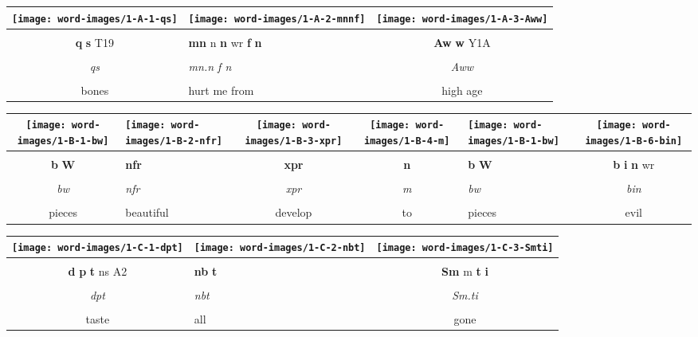 \vspace{7.5mm}

\begin{tabularx}{\linewidth}{cYc}
	\texttt{[image: word-images/1-A-1-qs]} &
	\texttt{[image: word-images/1-A-2-mnnf]} &
	\texttt{[image: word-images/1-A-3-Aww]} \\
	\hline \\ 
	\textbf{q} \textbf{s} T19 &
	\textbf{mn} n \textbf{n} wr \textbf{f} \textbf{n} &
	\textbf{Aw} \textbf{w} Y1A \\
	\hline \\ 
	\textit{qs} & \textit{mn.n f n} & \textit{Aww} \\
	\hline \\ 
	bones & hurt me from & high age
\end{tabularx}

\vspace{7.5mm}

\begin{tabularx}{\linewidth}{cYccYc}
	\texttt{[image: word-images/1-B-1-bw]} &
	\texttt{[image: word-images/1-B-2-nfr]} &
	\texttt{[image: word-images/1-B-3-xpr]} &
	\texttt{[image: word-images/1-B-4-m]} &
	\texttt{[image: word-images/1-B-1-bw]} &
	\texttt{[image: word-images/1-B-6-bin]} \\
	\hline \\ 
	\textbf{b} \textbf{W} &
	\textbf{nfr} &
	\textbf{xpr} &
	\textbf{n} &
	\textbf{b} \textbf{W} &
	\textbf{b} \textbf{i} \textbf{n} wr \\
	\hline \\ 
	\textit{bw} & \textit{nfr} & \textit{xpr} & \textit{m} & \textit{bw} & \textit{bin} \\
	\hline \\ 
	pieces & beautiful & develop & to & pieces & evil
\end{tabularx}

\vspace{7.5mm}

\begin{tabularx}{\linewidth}{cYc}
	\texttt{[image: word-images/1-C-1-dpt]} &
	\texttt{[image: word-images/1-C-2-nbt]} &
	\texttt{[image: word-images/1-C-3-Smti]} \\
	\hline \\ 
	\textbf{d} \textbf{p} \textbf{t} ns A2 &
	\textbf{nb} \textbf{t} &
	\textbf{Sm} m \textbf{t} \textbf{i} \\
	\hline \\ 
	\textit{dpt} & \textit{nbt} & \textit{Sm.ti} \\
	\hline \\ 
	taste & all & gone
\end{tabularx}

